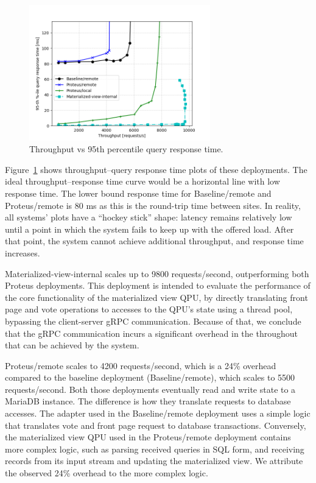 \begin{figure}[H]
\centering
  \includegraphics[width=0.7\textwidth]{./figures/evaluation/responseTime.png}
  \caption{Throughput vs 95th percentile query response time.}
  \label{fig:responseTime}
\end{figure}

Figure~\ref{fig:responseTime} shows throughput--query response time plots of these deployments.
The ideal throughput--response time curve would be a horizontal line with low response time.
The lower bound response time for Baseline/remote and Proteus/remote is 80 ms as this is the round-trip time between sites.
In reality, all systems' plots have a ``hockey stick'' shape:
latency remains relatively low until a point in which the system fails to keep up with the offered load.
After that point, the system cannot achieve additional throughput, and response time increases.

Materialized-view-internal scales up to 9800 requests/second,
outperforming both Proteus deployments.
This deployment is intended to evaluate the performance of the core functionality of the materialized view QPU,
by directly translating front page and vote operations to accesses to the QPU's state using a thread pool,
bypassing the client-server gRPC communication.
Because of that, we conclude that the gRPC communication incurs a significant overhead in the throughout that
can be achieved by the system.

Proteus/remote scales to 4200 requests/second, which is a 24\% overhead compared to the baseline deployment (Baseline/remote),
which scales to 5500 requests/second.
Both those deployments eventually read and write state to a MariaDB instance.
The difference is how they translate requests to database accesses.
The adapter used in the Baseline/remote deployment uses a simple logic that translates vote and front page request to database transactions.
Conversely, the materialized view QPU used in the Proteus/remote deployment contains more complex logic,
such as parsing received queries in SQL form, and receiving records from its input stream and updating the materialized view.
We attribute the observed 24\% overhead to the more complex logic.

